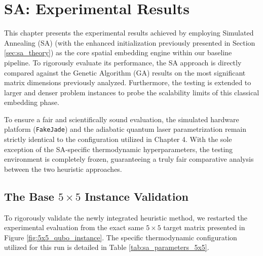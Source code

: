 \chapter{SA: Experimental Results}
\label{chap:SA_experiment}

This chapter presents the experimental results achieved by employing Simulated Annealing (SA) (with the enhanced initialization previously presented in Section \ref{sec:sa_theory}) as the core spatial embedding engine within our baseline pipeline. To rigorously evaluate its performance, the SA approach is directly compared against the Genetic Algorithm (GA) results on the most significant matrix dimensions previously analyzed. Furthermore, the testing is extended to larger and denser problem instances to probe the scalability limits of this classical embedding phase.

To ensure a fair and scientifically sound evaluation, the simulated hardware platform (\texttt{FakeJade}) and the adiabatic quantum laser parametrization remain strictly identical to the configuration utilized in Chapter 4. With the sole exception of the SA-specific thermodynamic hyperparameters, the testing environment is completely frozen, guaranteeing a truly fair comparative analysis between the two heuristic approaches.


\section{The Base $5\times5$ Instance Validation}

To rigorously validate the newly integrated heuristic method, we restarted the experimental evaluation from the exact same $5\times5$ target matrix presented in Figure \ref{fig:5x5_qubo_instance}. The specific thermodynamic configuration utilized for this run is detailed in Table \ref{tab:sa_parameters_5x5}.

